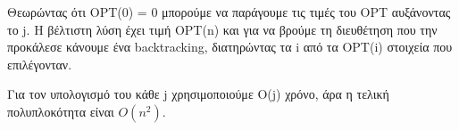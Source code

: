 \documentclass[a4paper,11pt]{article}
\begin{document}
Θεωρώντας ότι OPT(0) = 0 μπορούμε να παράγουμε τις τιμές του OPT αυξάνοντας το
j. Η βέλτιστη λύση έχει τιμή OPT(n) και για να βρούμε τη διευθέτηση που την
προκάλεσε κάνουμε ένα backtracking, διατηρώντας τα i από τα OPT(i) στοιχεία
που επιλέγονταν.

Για τον υπολογισμό του κάθε j χρησιμοποιούμε O(j) χρόνο, άρα η τελική
πολυπλοκότητα είναι $O(n^2)$.
\end{document}
